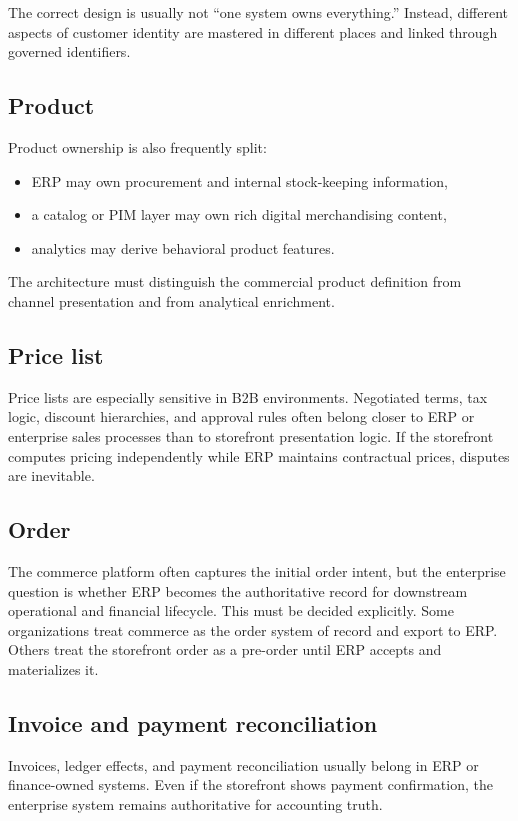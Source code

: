 The correct design is usually not ``one system owns everything.''
Instead, different aspects of customer identity are mastered in different places and linked through governed identifiers.

\subsection{Product}
Product ownership is also frequently split:
\begin{itemize}
  \item ERP may own procurement and internal stock-keeping information,
  \item a catalog or PIM layer may own rich digital merchandising content,
  \item analytics may derive behavioral product features.
\end{itemize}

The architecture must distinguish the commercial product definition from channel presentation and from analytical enrichment.

\subsection{Price list}
Price lists are especially sensitive in B2B environments.
Negotiated terms, tax logic, discount hierarchies, and approval rules often belong closer to ERP or enterprise sales processes than to storefront presentation logic.
If the storefront computes pricing independently while ERP maintains contractual prices, disputes are inevitable.

\subsection{Order}
The commerce platform often captures the initial order intent, but the enterprise question is whether ERP becomes the authoritative record for downstream operational and financial lifecycle.
This must be decided explicitly.
Some organizations treat commerce as the order system of record and export to ERP.
Others treat the storefront order as a pre-order until ERP accepts and materializes it.

\subsection{Invoice and payment reconciliation}
Invoices, ledger effects, and payment reconciliation usually belong in ERP or finance-owned systems.
Even if the storefront shows payment confirmation, the enterprise system remains authoritative for accounting truth.

